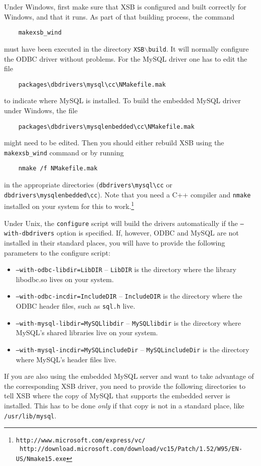 Under Windows, first make sure that XSB is configured and built correctly
for Windows, and that it runs. As part of that building process, the
command
\begin{verbatim}
    makexsb_wind  
\end{verbatim}
must have been executed
in the directory {\tt XSB$\backslash$build}. It will normally configure the ODBC
driver without problems. For the MySQL driver one has to edit the file
\begin{verbatim}
    packages\dbdrivers\mysql\cc\NMakefile.mak  
\end{verbatim}
to indicate where MySQL is installed. To build the embedded MySQL driver
under Windows, the file
\begin{verbatim}
    packages\dbdrivers\mysqlenbedded\cc\NMakefile.mak  
\end{verbatim}
might need to be edited. Then you should either rebuild XSB using the
{\tt makexsb\_wind} command or by running
\begin{verbatim}
    nmake /f NMakefile.mak
\end{verbatim}
in the appropriate directories (\verb|dbdrivers\mysql\cc| or
\verb|dbdrivers\mysqlenbedded\cc|). Note that you need a C++ compiler and
{\tt nmake} installed on your system for this to work.\footnote{
  {\tt http://www.microsoft.com/express/vc/}\\
  {\tt
    http://download.microsoft.com/download/vc15/Patch/1.52/W95/EN-US/Nmake15.exe} 
  }

Under Unix, the {\tt configure} script will build the drivers automatically
if the {\tt --with-dbdrivers} option is specified.  If, however, ODBC and
MySQL are not installed in their standard places, you will have to provide
the following parameters to the configure script:
\begin{itemize}
\item  {\tt --with-odbc-libdir=LibDIR} -- {\tt LibDIR} is the directory
  where the library libodbc.so lives on your system. 
\item  {\tt --with-odbc-incdir=IncludeDIR} -- {\tt IncludeDIR} is the
  directory where the ODBC header files, such as {\tt sql.h} live.
\item {\tt --with-mysql-libdir=MySQLlibdir} -- {\tt MySQLlibdir} is the
  directory where MySQL's shared libraries live on your system.
\item {\tt --with-mysql-incdir=MySQLincludeDir} -- {\tt MySQLincludeDir} is
  the directory where MySQL's header files live.  
\end{itemize}
If you are also using the embedded MySQL server and want to take advantage
of the corresponding XSB driver, you need to provide the following directories
to tell XSB where the copy of MySQL that supports the embedded server is installed.
This has to be done \emph{only} if that copy is not in a standard place,
like {\tt /usr/lib/mysql}.  

